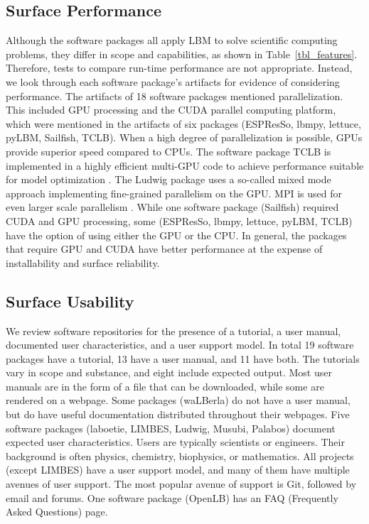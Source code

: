 \documentclass[final, 3p, times, authoryear]{elsarticle}
\begin{document}
\subsection{Surface Performance}

Although the software packages all apply LBM to solve scientific computing
problems, they differ in scope and capabilities, as shown in
Table~\ref{tbl_features}. Therefore, tests to compare run-time performance are
not appropriate. Instead, we look through each software package's artifacts
for evidence of considering performance. The artifacts of 18 software packages
mentioned parallelization. This included GPU processing and the CUDA parallel
computing platform, which were mentioned in the artifacts of six packages
(ESPResSo, lbmpy, lettuce, pyLBM, Sailfish, TCLB). When a high degree of
parallelization is possible, GPUs provide superior speed compared to CPUs. The
software package TCLB is implemented in a highly efficient multi-GPU code to
achieve performance suitable for model optimization \citep{rutkowski2020open}.
The Ludwig package uses a so-called mixed mode approach implementing
fine-grained parallelism on the GPU.  MPI is used for even larger scale
parallelism \citep{gray2013ludwig}. While one software package (Sailfish)
required CUDA and GPU processing, some (ESPResSo, lbmpy, lettuce, pyLBM, TCLB)
have the option of using either the GPU or the CPU. In general, the packages
that require GPU and CUDA have better performance at the expense of
installability and surface reliability.

\subsection{Surface Usability}

We review software repositories for the presence of a tutorial, a user manual,
documented user characteristics, and a user support model. In total 19 software
packages have a tutorial, 13 have a user manual, and 11 have both. The tutorials
vary in scope and substance, and eight include expected output. Most user
manuals are in the form of a file that can be downloaded, while some are
rendered on a webpage. Some packages (waLBerla) do not have a user manual, but
do have useful documentation distributed throughout their webpages. Five
software packages (laboetie, LIMBES, Ludwig, Musubi, Palabos) document expected
user characteristics. Users are typically scientists or engineers. Their
background is often physics, chemistry, biophysics, or mathematics. All projects
(except LIMBES) have a user support model, and many of them have multiple
avenues of user support. The most popular avenue of support is Git, followed by
email and forums. One software package (OpenLB) has an FAQ (Frequently Asked
Questions) page.    
\end{document}
